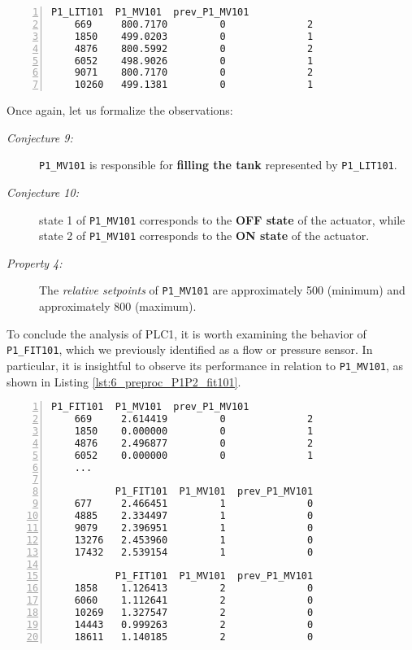 \begin{lstlisting}[language=bash, numbers=left, caption=\texttt{P1\_MV101} state changes and relative setpoints, label=lst:6_preproc_P1P2_mv101state]
	       P1_LIT101  P1_MV101  prev_P1_MV101
	669     800.7170         0              2
	1850    499.0203         0              1
	4876    800.5992         0              2
	6052    498.9026         0              1
	9071    800.7170         0              2
	10260   499.1381         0              1
\end{lstlisting}

\noindent Once again, let us formalize the observations:
\begin{description}
	\item[\colorbox{backcolourtext}{\normalfont\textit{Conjecture 9:}}] \texttt{P1\_MV101} is responsible for \textbf{filling the tank} represented by \texttt{P1\_LIT101}.
	
	\item[\colorbox{backcolourtext}{\normalfont\textit{Conjecture 10:}}] state 1 of \texttt{P1\_MV101} corresponds to the \textbf{OFF state} of the actuator, while state 2 of \texttt{P1\_MV101} corresponds to the \textbf{ON state} of the actuator.
	
	\item[\colorbox{backcolourtext}{\normalfont\textit{Property 4:}}] The \textit{relative setpoints} of \texttt{P1\_MV101} are approximately 500 (minimum) and approximately 800 (maximum).
\end{description}

To conclude the analysis of PLC1, it is worth examining the behavior of \texttt{P1\_FIT101}, which we previously identified as a flow or pressure sensor. In particular, it is insightful to observe its performance in relation to \texttt{P1\_MV101}, as shown in Listing \ref{lst:6_preproc_P1P2_fit101}.

\begin{lstlisting}[language=bash, numbers=left, caption=\texttt{P1\_FIT101} behavior, label=lst:6_preproc_P1P2_fit101]
	       P1_FIT101  P1_MV101  prev_P1_MV101
	669     2.614419         0              2
	1850    0.000000         0              1
	4876    2.496877         0              2
	6052    0.000000         0              1
	...
		
	       P1_FIT101  P1_MV101  prev_P1_MV101
	677     2.466451         1              0
	4885    2.334497         1              0
	9079    2.396951         1              0
	13276   2.453960         1              0
	17432   2.539154         1              0
	
	       P1_FIT101  P1_MV101  prev_P1_MV101
	1858    1.126413         2              0
	6060    1.112641         2              0
	10269   1.327547         2              0
	14443   0.999263         2              0
	18611   1.140185         2              0
\end{lstlisting}


